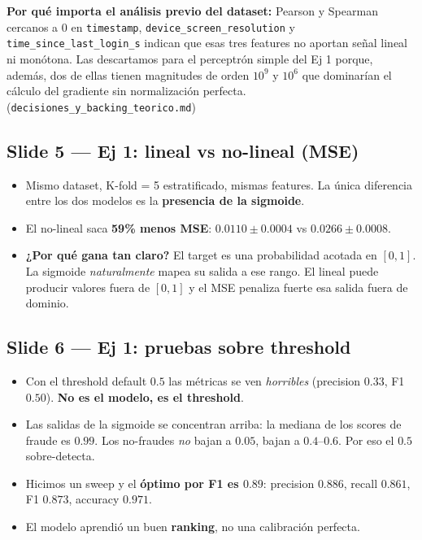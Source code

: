 \documentclass[11pt,a4paper]{article}
\newcommand{\nref}[1]{\textcolor{muted}{\small(\texttt{#1})}}
\begin{document}
\begin{nota}
\textbf{Por qué importa el análisis previo del dataset:} Pearson y Spearman cercanos
a 0 en \texttt{timestamp}, \texttt{device\_screen\_resolution} y
\texttt{time\_since\_last\_login\_s} indican que esas tres features no aportan
señal lineal ni monótona. Las descartamos para el perceptrón simple del Ej 1
porque, además, dos de ellas tienen magnitudes de orden $10^9$ y $10^6$ que
dominarían el cálculo del gradiente sin normalización perfecta.
\nref{decisiones\_y\_backing\_teorico.md}
\end{nota}

\subsection{Slide 5 — Ej 1: lineal vs no-lineal (MSE)}

\begin{decir}
\begin{itemize}[leftmargin=*,topsep=0pt]
  \item Mismo dataset, K-fold = 5 estratificado, mismas features. La única diferencia
        entre los dos modelos es la \textbf{presencia de la sigmoide}.
  \item El no-lineal saca \textbf{59\% menos MSE}: $0.0110 \pm 0.0004$ vs
        $0.0266 \pm 0.0008$.
  \item \textbf{¿Por qué gana tan claro?} El target es una probabilidad acotada en
        $[0,1]$. La sigmoide \emph{naturalmente} mapea su salida a ese rango. El
        lineal puede producir valores fuera de $[0,1]$ y el MSE penaliza fuerte
        esa salida fuera de dominio.
\end{itemize}
\end{decir}

\subsection{Slide 6 — Ej 1: pruebas sobre threshold}

\begin{decir}
\begin{itemize}[leftmargin=*,topsep=0pt]
  \item Con el threshold default $0.5$ las métricas se ven \emph{horribles}
        (precision $0.33$, F1 $0.50$). \textbf{No es el modelo, es el threshold}.
  \item Las salidas de la sigmoide se concentran arriba: la mediana de los scores
        de fraude es $0.99$. Los no-fraudes \emph{no} bajan a $0.05$, bajan a
        $0.4$--$0.6$. Por eso el $0.5$ sobre-detecta.
  \item Hicimos un sweep y el \textbf{óptimo por F1 es $0.89$}: precision $0.886$,
        recall $0.861$, F1 $0.873$, accuracy $0.971$.
  \item El modelo aprendió un buen \textbf{ranking}, no una calibración perfecta.
\end{itemize}
\end{decir}
\end{document}
